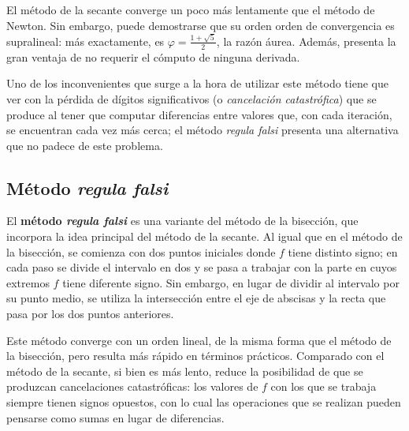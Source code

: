 El método de la secante converge un poco más lentamente que el método de
Newton. Sin embargo, puede demostrarse que su orden orden de convergencia es
supralineal: más exactamente, es $\varphi = \frac{1 + \sqrt{5}}{2}$, la
razón áurea. Además, presenta la gran ventaja de no requerir el cómputo
de ninguna derivada.

Uno de los inconvenientes que surge a la hora de utilizar este método tiene
que ver con la pérdida de dígitos significativos (o \emph{cancelación
catastrófica}) que se produce al tener que computar diferencias entre
valores que, con cada iteración, se encuentran cada vez más cerca; el método
\emph{regula falsi} presenta una alternativa que no padece de este problema.

\subsection{Método \emph{regula falsi}}
El \textbf{método \emph{regula falsi}} es una variante del método de
la bisección, que incorpora la idea principal del método de la secante.
Al igual que en el método de la bisección, se comienza con dos puntos
iniciales donde $f$ tiene distinto signo;
en cada paso se divide el intervalo en dos y se
pasa a trabajar con la parte en cuyos extremos $f$ tiene diferente signo.
Sin embargo, en lugar de dividir al intervalo por su punto medio, se utiliza
la intersección entre el eje de abscisas y la recta que pasa por los dos
puntos anteriores.

Este método converge con un orden lineal, de la misma forma que el método de
la bisección, pero resulta más rápido en términos prácticos. Comparado con
el método de la secante, si bien es más lento, reduce la posibilidad de que
se produzcan cancelaciones catastróficas: los valores de $f$ con los que
se trabaja siempre tienen signos opuestos, con lo cual las operaciones que se
realizan pueden pensarse como sumas en lugar de diferencias.
